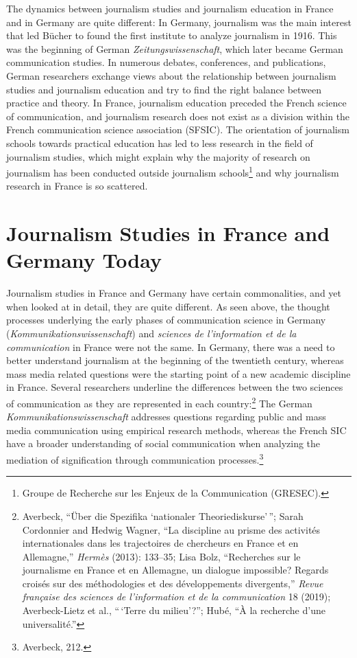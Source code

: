 \documentclass{tufte-handout}
\begin{document}
The dynamics between journalism studies and journalism education in
France and in Germany are quite different: In Germany, journalism was
the main interest that led Bücher to found the first institute to
analyze journalism in 1916. This was the beginning of German
\emph{Zeitungswissenschaft}, which later became German communication
studies. In numerous debates, conferences, and publications, German
researchers exchange views about the relationship between journalism
studies and journalism education and try to find the right balance
between practice and theory. In France, journalism education preceded
the French science of communication, and journalism research does not
exist as a division within the French communication science association
(SFSIC). The orientation of journalism schools towards practical
education has led to less research in the field of journalism studies,
which might explain why the majority of research on journalism has been
conducted outside journalism schools\footnote{Groupe de Recherche sur
  les Enjeux de la Communication (GRESEC).} and why journalism research
in France is so scattered.

\hypertarget{journalism-studies-in-france-and-germany-today}{%
\section{Journalism Studies in France and Germany
Today}\label{journalism-studies-in-france-and-germany-today}}

Journalism studies in France and Germany have certain commonalities, and
yet when looked at in detail, they are quite different. As seen above,
the thought processes underlying the early phases of communication
science in Germany (\emph{Kommunikationswissenschaft}) and
\emph{sciences de l'information et de la communication} in France were
not the same. In Germany, there was a need to better understand
journalism at the beginning of the twentieth century, whereas mass media
related questions were the starting point of a new academic discipline
in France. Several researchers underline the differences between the two
sciences of communication as they are represented in each
country:\footnote{Averbeck, ``Über die Spezifika `nationaler
  Theoriediskurse'\,''; Sarah Cordonnier and Hedwig Wagner, ``La
  discipline au prisme des activités internationales dans les
  trajectoires de chercheurs en France et en Allemagne,'' \emph{Hermès}
  (2013): 133--35; Lisa Bolz, ``Recherches sur le journalisme en France
  et en Allemagne, un dialogue impossible? Regards croisés sur des
  méthodologies et des développements divergents,'' \emph{Revue
  française des sciences de l'information et de la communication} 18
  (2019); Averbeck-Lietz et al., ``\,`Terre du milieu'?''; Hubé, ``À la
  recherche d'une universalité.''} The German
\emph{Kommunikationswissenschaft} addresses questions regarding public
and mass media communication using empirical research methods, whereas
the French SIC have a broader understanding of social communication when
analyzing the mediation of signification through communication
processes.\footnote{Averbeck, 212.}
\end{document}
